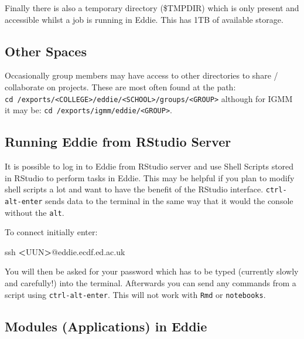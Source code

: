 \documentclass[
]{book}
\newenvironment{Shaded}{\begin{snugshade}}{\end{snugshade}}
\newcommand{\FunctionTok}[1]{\textcolor[rgb]{0.00,0.00,0.00}{#1}}
\newcommand{\NormalTok}[1]{#1}
\newcommand{\OperatorTok}[1]{\textcolor[rgb]{0.81,0.36,0.00}{\textbf{#1}}}
\begin{document}
Finally there is also a temporary directory (\$TMPDIR) which is only present and accessible whilst a job is running in Eddie. This has 1TB of available storage.

\hypertarget{other-spaces}{%
\subsection{Other Spaces}\label{other-spaces}}

Occasionally group members may have access to other directories to share / collaborate on projects. These are most often found at the path: \texttt{cd\ /exports/\textless{}COLLEGE\textgreater{}/eddie/\textless{}SCHOOL\textgreater{}/groups/\textless{}GROUP\textgreater{}} although for IGMM it may be: \texttt{cd\ /exports/igmm/eddie/\textless{}GROUP\textgreater{}}.

\hypertarget{running-eddie-from-rstudio-server}{%
\subsection{Running Eddie from RStudio Server}\label{running-eddie-from-rstudio-server}}

It is possible to log in to Eddie from RStudio server and use Shell Scripts stored in RStudio to perform tasks in Eddie. This may be helpful if you plan to modify shell scripts a lot and want to have the benefit of the RStudio interface. \texttt{ctrl-alt-enter} sends data to the terminal in the same way that it would the console without the \texttt{alt}.

To connect initially enter:

\begin{Shaded}
\begin{Highlighting}[]
\FunctionTok{ssh} \OperatorTok{\textless{}}\NormalTok{UUN}\OperatorTok{\textgreater{}}\NormalTok{@eddie.ecdf.ed.ac.uk}
\end{Highlighting}
\end{Shaded}

You will then be asked for your password which has to be typed (currently slowly and carefully!) into the terminal. Afterwards you can send any commands from a script using \texttt{ctrl-alt-enter}. This will not work with \texttt{Rmd} or \texttt{notebooks}.

\hypertarget{modules-applications-in-eddie}{%
\subsection{Modules (Applications) in Eddie}\label{modules-applications-in-eddie}}
\end{document}
